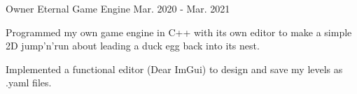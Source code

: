 \begin{cventries}
  \cventry
    {Owner} %
    {Eternal Game Engine} %
    {\href{https://github.com/BrandnerKasper/Eternal}{\faGithubSquare}} %
    {Mar. 2020 - Mar. 2021} %
    {
      \begin{cvitems} %
        \item {Programmed my own game engine in C++ with its own editor to make a simple 2D jump'n'run about leading a duck egg back into its nest.}
        \item {Implemented a functional editor (Dear ImGui) to design and save my levels as .yaml files.}
      \end{cvitems}
    }

\end{cventries}
